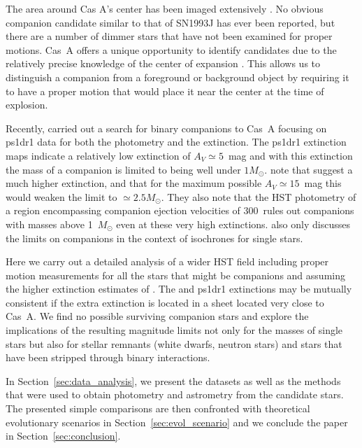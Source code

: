 \documentclass{aa}
\begin{document}
The area around Cas A's center has been imaged extensively \citep[][and references therein]{1976ApJS...32..351K, 2006ApJ...636..848F, 2014ApJ...789..138P}.  No obvious companion candidate similar to that of SN1993J has ever been reported,  but there are a number of dimmer stars that have not been examined for proper motions.
%
Cas~A offers a unique opportunity to identify candidates due to the relatively precise knowledge of the center of expansion \citep[accuracy of $1^{\prime\prime}$;][]{2001AJ....122..297T}. This allows us to distinguish a companion from a foreground or background object by requiring it to have a proper motion that would place it near the center at the time of explosion.



Recently, \citet{2018MNRAS.473.1633K} carried out a search for binary
companions to Cas~A focusing on \gls{ps1dr1} data for both the
photometry and the extinction.  The \gls{ps1dr1} extinction maps
\citep{2015ApJ...810...25G} indicate a relatively low extinction of
$A_V \simeq 5$~mag and with this extinction the mass of a companion is
limited to being well under $1M_\odot$. \citet{2018MNRAS.473.1633K}
note that \citet[][]{2017MNRAS.465.3309D} suggest a much higher
extinction, and that for the maximum possible $A_V\simeq 15$~mag this would weaken the limit to $\simeq 2.5 M_\odot$.  They also note
that the HST photometry of a region encompassing companion ejection velocities of $300$\kms\ rules out companions with masses above 1~$M_\odot$ even at these very high extinctions. \citet{2018MNRAS.473.1633K} also only discusses the limits on companions in the context of isochrones for single stars.

Here we carry out a detailed analysis of a wider HST field including proper motion measurements for all the stars that might be companions and assuming the higher extinction estimates of  \citet{2017MNRAS.465.3309D}.  The \citet{2017MNRAS.465.3309D} and  \gls{ps1dr1} extinctions may be mutually consistent if the extra extinction is located in a sheet located very close to Cas~A.  We find no possible surviving companion stars and explore the implications of the resulting magnitude limits not only for the masses of single stars but also for stellar remnants (white dwarfs, neutron stars) and stars that have been stripped through binary interactions.

In Section~\ref{sec:data_analysis},  we present the datasets as well as the methods that were used to obtain photometry and astrometry from the candidate stars. The presented simple comparisons are then confronted with theoretical evolutionary scenarios in Section~\ref{sec:evol_scenario} and we conclude the paper in Section~\ref{sec:conclusion}.
\end{document}

